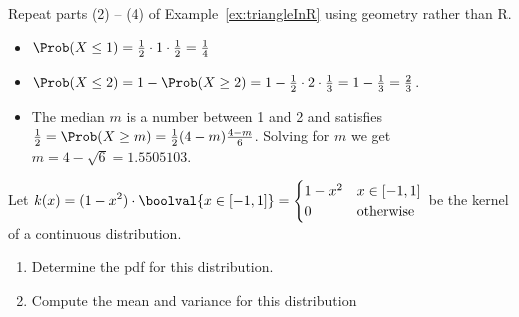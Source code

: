 \documentclass[twoside]{book}\usepackage[]{graphicx}\usepackage[]{xcolor}
\def\R{{\sf R}}
\begin{document}
\begin{problem}
	Repeat parts (2) -- (4) of Example~\ref{ex:triangleInR} using geometry 
	rather than \R.

\end{problem}

\begin{solution}
	\begin{itemize}
		\item
			$\Prob(X \le 1) = \frac 12 \cdot 1 \cdot \frac12 = \frac 14$
		\item
			$\Prob(X \le 2) = 1 - \Prob(X \ge 2) =  1 - \frac12 \cdot 2 \cdot \frac13 
			= 1 - \frac 13 = \frac23$.
		\item
			The median $m$ is a number between 1 and 2 and satisfies
			$\frac 12 = \Prob(X \ge m) = \frac12 (4-m) \frac{4-m}{6}$.  
			Solving for $m$ we get $m = 4 - \sqrt{6} = 1.5505103$.
	\end{itemize}
\end{solution}

\begin{problem}
	Let $\displaystyle k(x) = (1 - x^2) \cdot \boolval{ x \in [-1,1] } = 
	\begin{cases}
		1-x^2 & x \in [-1,1] \\ 
		0 & \mbox{otherwise} 
	\end{cases}$ be the kernel of a continuous distribution.
	\begin{enumerate}
		\item
			Determine the pdf for this distribution.
		\item
			Compute the mean and variance for this distribution
	\end{enumerate}
\end{problem}
\end{document}
